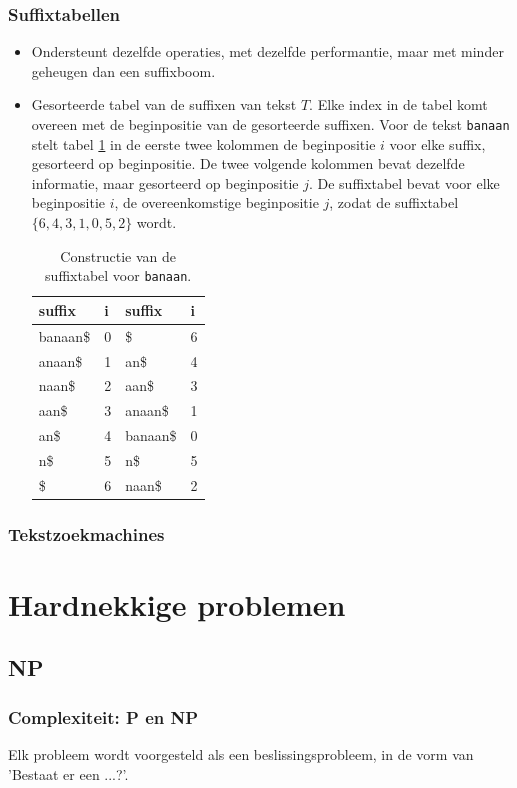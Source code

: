 \documentclass{report}
\begin{document}
\section{Suffixtabellen}
\begin{itemize}
	\item[\good] Ondersteunt dezelfde operaties, met dezelfde performantie, maar met minder geheugen dan een suffixboom.
	\item[\info] Gesorteerde tabel van de suffixen van tekst $T$. Elke index in de tabel komt overeen met de beginpositie van de gesorteerde suffixen.
	Voor de tekst \texttt{banaan} stelt tabel \ref{table:suffixtable} in de eerste twee kolommen de beginpositie $i$ voor elke suffix, gesorteerd op beginpositie. De twee volgende kolommen bevat dezelfde informatie, maar gesorteerd op beginpositie $j$. De suffixtabel bevat voor elke beginpositie $i$, de overeenkomstige beginpositie $j$, zodat de suffixtabel $\{6, 4, 3, 1, 0, 5, 2\}$ wordt.
	\begin{table}[ht]
		\centering
		\begin{tabular}{| l | l || l | l |}
			\hline 
			suffix & i & suffix & i \\
			\hline 
			banaan\$ & 0 & \$ 		& 6 \\
			anaan\$  & 1 & an\$ 	& 4 \\
			naan\$   & 2 & aan\$  	& 3 \\
			aan\$    & 3 & anaan\$  & 1 \\
			an\$     & 4 & banaan\$ & 0 \\
			n\$      & 5 & n\$ 	    & 5 \\
			\$       & 6 & naan\$   & 2 \\
			\hline
		\end{tabular}
		\caption{Constructie van de suffixtabel voor \texttt{banaan}.}
		\label{table:suffixtable}
	\end{table}
\end{itemize}
\section{Tekstzoekmachines}
\part{Hardnekkige problemen}
\chapter{NP}
\section{Complexiteit: P en NP}
Elk probleem wordt voorgesteld als een beslissingsprobleem, in de vorm van 'Bestaat er een ...?'.
\end{document}

